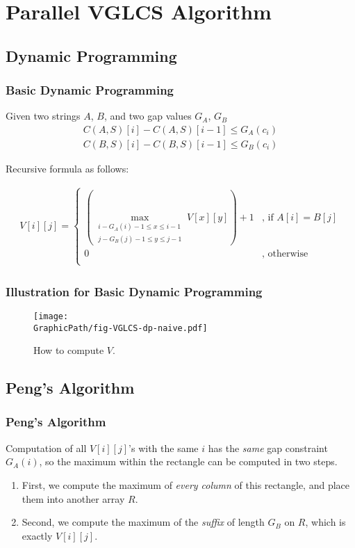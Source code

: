 \section{Parallel VGLCS Algorithm}

\subsection{Dynamic Programming}
\begin{frame}
    \frametitle{Basic Dynamic Programming}
	Given two strings $A$, $B$, and two gap values $G_{A}$, $G_{B}$
	\begin{align*}
        C(A, S)[i] - C(A, S)[i-1] \le G_{A}(c_i) \\
        C(B, S)[i] - C(B, S)[i-1] \le G_{B}(c_i)
    \end{align*}	

    Recursive formula as follows:

    \begin{align*}
    	V[i][j] = \left\{\begin{matrix}
 			(\max\limits_{
 				\substack{i-G_A(i)-1 \le x \le i-1 \\ 
 						  j-G_B(j)-1 \le y \le j-1}} 
 				V[x][y])+1
 				& \text{, if } A[i] = B[j] \\
 				0 & \text{, otherwise}\\
			\end{matrix}\right.
    \end{align*}
\end{frame}

\begin{frame}
    \frametitle{Illustration for Basic Dynamic Programming}
	\begin{figure}[!thb]
		\texttt{[image: \\GraphicPath/fig-VGLCS-dp-naive.pdf]}
		\caption{How to compute $V$.}
		\label{fig:basic-dp-VGLCS}
	\end{figure}
\end{frame}

\subsection{Peng's Algorithm}
\begin{frame}
    \frametitle{Peng's Algorithm}
   	Computation of all $V[i][j]$'s with the same $i$ has the {\em same}
	gap constraint $G_A(i)$, so the maximum within the rectangle can be
	computed in two steps.

    \begin{enumerate}
    	\setlength\itemsep{1em}
    	\item 
    		First, we compute the maximum of {\em every column} of this
			rectangle, and place them into another array $R$.
		\item 
			Second, we compute the maximum of the {\em suffix} of length
			$G_B$ on $R$, which is exactly $V[i][j]$.
    \end{enumerate}
\end{frame}

